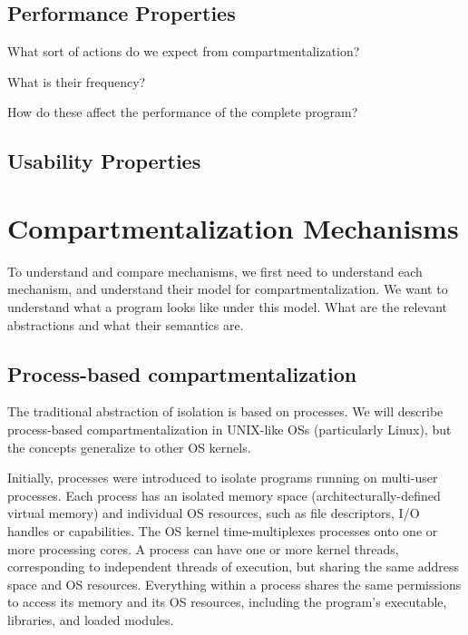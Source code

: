\subsection{Performance Properties}

What sort of actions do we expect from compartmentalization?

What is their frequency?

How do these affect the performance of the complete program?


\subsection{Usability Properties}




\section{Compartmentalization Mechanisms}
\label{sec:comp}

To understand and compare mechanisms, we first need to understand each 
mechanism, and understand their model for compartmentalization.
We want to understand what a program looks like under this model.
What are the relevant abstractions and what their semantics are.


\subsection{Process-based compartmentalization}

The traditional abstraction of isolation is based on processes.
We will describe process-based compartmentalization in UNIX-like OSs
(particularly Linux), 
but the concepts generalize to other OS kernels.

Initially, processes were introduced to isolate programs running on multi-user
processes.
Each process has an isolated memory space (architecturally-defined virtual memory)
and individual OS resources, such as file descriptors, I/O handles or capabilities.
The OS kernel time-multiplexes processes onto one or more processing cores.
A process can have one or more kernel threads, corresponding to independent threads
of execution, but sharing the same address space and OS resources.
Everything within a process shares the same permissions to access its memory and
its OS resources, including the program's executable, libraries, and loaded modules.

